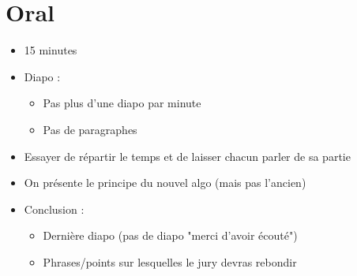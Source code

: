 \documentclass{article}
\begin{document}
\section*{Oral}
	\begin{itemize}
		\item 15 minutes
		\item Diapo : \begin{itemize}
			\item Pas plus d'une diapo par minute
			\item Pas de paragraphes
		\end{itemize}
		\item Essayer de répartir le temps et de laisser chacun parler de sa partie
		\item On présente le principe du nouvel algo (mais pas l'ancien)
		\item Conclusion : \begin{itemize}
			\item Dernière diapo (pas de diapo "merci d'avoir écouté")
			\item Phrases/points sur lesquelles le jury devras rebondir
		\end{itemize}
	\end{itemize}
\end{document}
